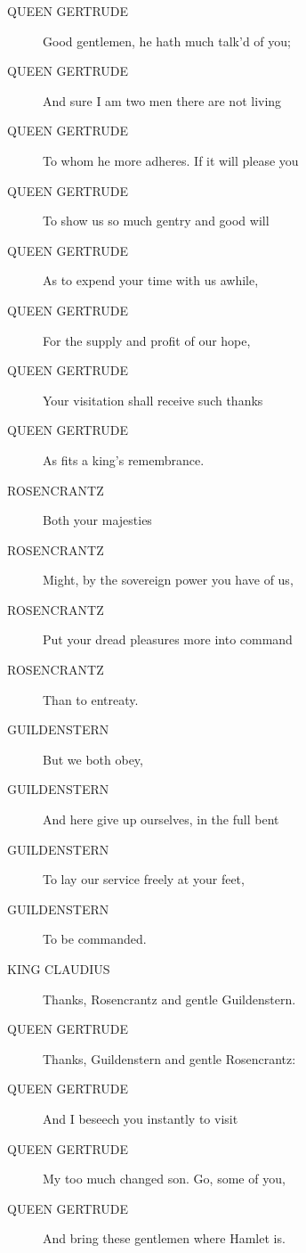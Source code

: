 \documentclass{article}
\begin{document}
\begin{description}
            
\item[QUEEN GERTRUDE] Good gentlemen, he hath much talk'd of you;
\item[QUEEN GERTRUDE] And sure I am two men there are not living
\item[QUEEN GERTRUDE] To whom he more adheres. If it will please you
\item[QUEEN GERTRUDE] To show us so much gentry and good will
\item[QUEEN GERTRUDE] As to expend your time with us awhile,
\item[QUEEN GERTRUDE] For the supply and profit of our hope,
\item[QUEEN GERTRUDE] Your visitation shall receive such thanks
\item[QUEEN GERTRUDE] As fits a king's remembrance.
\end{description}
          
\begin{description}
            
\item[ROSENCRANTZ] Both your majesties
\item[ROSENCRANTZ] Might, by the sovereign power you have of us,
\item[ROSENCRANTZ] Put your dread pleasures more into command
\item[ROSENCRANTZ] Than to entreaty.
\end{description}
          
\begin{description}
            
\item[GUILDENSTERN] But we both obey,
\item[GUILDENSTERN] And here give up ourselves, in the full bent
\item[GUILDENSTERN] To lay our service freely at your feet,
\item[GUILDENSTERN] To be commanded.
\end{description}
          
\begin{description}
            
\item[KING CLAUDIUS] Thanks, Rosencrantz and gentle Guildenstern.
\end{description}
          
\begin{description}
            
\item[QUEEN GERTRUDE] Thanks, Guildenstern and gentle Rosencrantz:
\item[QUEEN GERTRUDE] And I beseech you instantly to visit
\item[QUEEN GERTRUDE] My too much changed son. Go, some of you,
\item[QUEEN GERTRUDE] And bring these gentlemen where Hamlet is.
\end{description}
          
\end{document}
